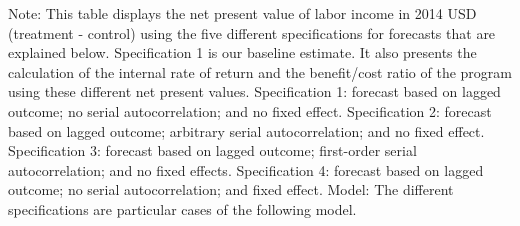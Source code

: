 \documentclass[static]{JJH-Beamer}
\begin{document}
\begin{frame}
{\flushleft \tiny Note: This table displays the net present value of labor income in 2014 USD (treatment - control) using the five different specifications for forecasts that are explained below. Specification 1 is our baseline estimate. It also presents the calculation of the internal rate of return and the benefit/cost ratio of the program using these different net present values. Specification 1: forecast based on lagged outcome; no serial autocorrelation; and no fixed effect. Specification 2: forecast based on lagged outcome; arbitrary serial autocorrelation; and no fixed effect. Specification 3: forecast based on lagged outcome; first-order serial autocorrelation; and no fixed effects. Specification 4: forecast based on lagged outcome; no serial autocorrelation; and fixed effect. Model: The different specifications are particular cases of the following model.\\}

\end{frame}
\end{document}
